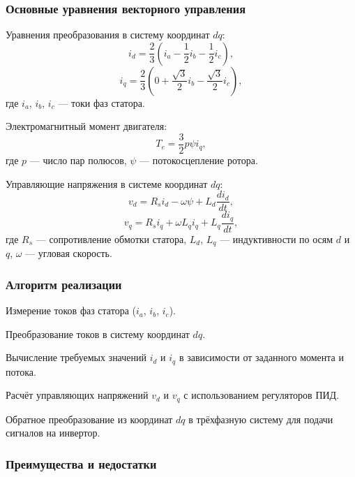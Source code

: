 \documentclass[a4paper,14pt]{extarticle} %
\begin{document}
\subsubsection*{Основные уравнения векторного управления}

Уравнения преобразования в систему координат $dq$:
\begin{equation}
i_d = \frac{2}{3} \left( i_a - \frac{1}{2}i_b - \frac{1}{2}i_c \right),
\end{equation}
\begin{equation}
i_q = \frac{2}{3} \left( 0 + \frac{\sqrt{3}}{2}i_b - \frac{\sqrt{3}}{2}i_c \right),
\end{equation}
где $i_a$, $i_b$, $i_c$ — токи фаз статора.

Электромагнитный момент двигателя:
\begin{equation}
T_e = \frac{3}{2}p\psi i_q,
\end{equation}
где $p$ — число пар полюсов, $\psi$ — потокосцепление ротора.

Управляющие напряжения в системе координат $dq$:
\begin{equation}
v_d = R_s i_d - \omega \psi + L_d \frac{di_d}{dt},
\end{equation}
\begin{equation}
v_q = R_s i_q + \omega L_q i_q + L_q \frac{di_q}{dt},
\end{equation}
где $R_s$ — сопротивление обмотки статора, $L_d$, $L_q$ — индуктивности по осям $d$ и $q$, $\omega$ — угловая скорость.

\subsubsection*{Алгоритм реализации}

Измерение токов фаз статора ($i_a$, $i_b$, $i_c$).

Преобразование токов в систему координат $dq$.

Вычисление требуемых значений $i_d$ и $i_q$ в зависимости от заданного момента и потока.

Расчёт управляющих напряжений $v_d$ и $v_q$ с использованием регуляторов ПИД.

Обратное преобразование из координат $dq$ в трёхфазную систему для подачи сигналов на инвертор.

\subsubsection*{Преимущества и недостатки}
\end{document}
